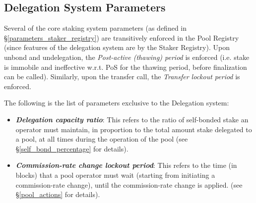 \subsection{Delegation System Parameters} \label{parameters_pool_registry}
Several of the core staking system parameters (as defined in \S\ref{parameters_staker_registry}) are transitively enforced in the Pool Registry (since features of the delegation system are  by the Staker Registry). Upon unbond and undelegation, the \textit{Post-active (thawing) period} is enforced (i.e. stake is immobile and ineffective w.r.t. PoS for the thawing period, before finalization can be called). Similarly, upon the transfer call, the \textit{Transfer lockout period} is enforced. 

The following is the list of parameters exclusive to the Delegation system: 
\begin{itemize}
    \item \textbf{\textit{Delegation capacity ratio}}: This refers to the ratio of self-bonded stake an operator must maintain, in proportion to the total amount stake delegated to a pool, at all times during the operation of the pool (see \S\ref{self_bond_percentage} for details).
    \item \textbf{\textit{Commission-rate change lockout period}}: This refers to the time (in blocks) that a pool operator must wait (starting from initiating a commission-rate change), until the commission-rate change is applied. (see \S\ref{pool_actions} for details).
\end{itemize}

